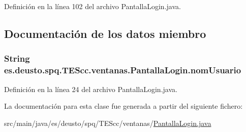 Definición en la línea 102 del archivo Pantalla\+Login.\+java.



\subsection{Documentación de los datos miembro}
\hypertarget{classes_1_1deusto_1_1spq_1_1_t_e_scc_1_1ventanas_1_1_pantalla_login_ab8dd71abec8294c65e6fdef0655817c8}{
\subsubsection[{nom\+Usuario}]{\setlength{\rightskip}{0pt plus 5cm}String es.\+deusto.\+spq.\+T\+E\+Scc.\+ventanas.\+Pantalla\+Login.\+nom\+Usuario\hspace{0.3cm}{\ttfamily [static]}}}\label{classes_1_1deusto_1_1spq_1_1_t_e_scc_1_1ventanas_1_1_pantalla_login_ab8dd71abec8294c65e6fdef0655817c8}


Definición en la línea 24 del archivo Pantalla\+Login.\+java.



La documentación para esta clase fue generada a partir del siguiente fichero\+:\begin{DoxyCompactItemize}
\item 
src/main/java/es/deusto/spq/\+T\+E\+Scc/ventanas/\hyperlink{_pantalla_login_8java}{Pantalla\+Login.\+java}\end{DoxyCompactItemize}
